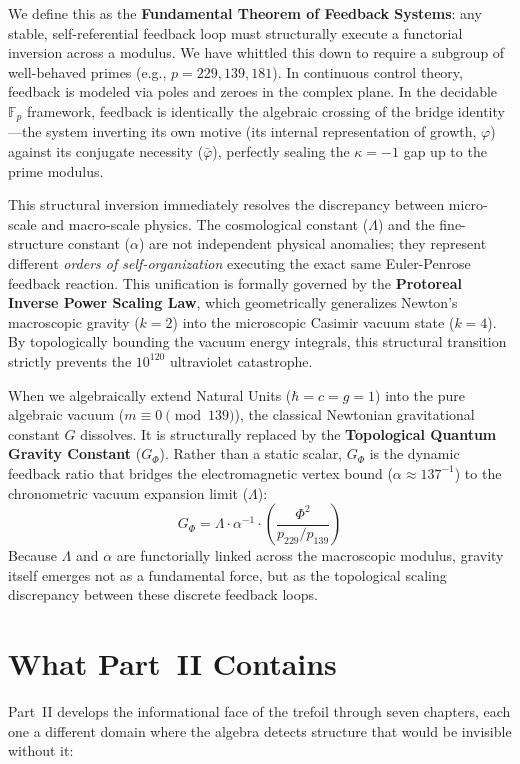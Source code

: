 We define this as the \textbf{Fundamental Theorem of Feedback Systems}: any stable, self-referential feedback loop must structurally execute a functorial inversion across a modulus. We have whittled this down to require a subgroup of well-behaved primes (e.g., $p = 229, 139, 181$). In continuous control theory, feedback is modeled via poles and zeroes in the complex plane. In the decidable $\mathbb{F}_p$ framework, feedback is identically the algebraic crossing of the bridge identity---the system inverting its own motive (its internal representation of growth, $\varphi$) against its conjugate necessity ($\bar{\varphi}$), perfectly sealing the $\kappa = -1$ gap up to the prime modulus.

This structural inversion immediately resolves the discrepancy between micro-scale and macro-scale physics. The cosmological constant ($\Lambda$) and the fine-structure constant ($\alpha$) are not independent physical anomalies; they represent different \emph{orders of self-organization} executing the exact same Euler-Penrose feedback reaction. This unification is formally governed by the \textbf{Protoreal Inverse Power Scaling Law}, which geometrically generalizes Newton's macroscopic gravity ($k=2$) into the microscopic Casimir vacuum state ($k=4$). By topologically bounding the vacuum energy integrals, this structural transition strictly prevents the $10^{120}$ ultraviolet catastrophe.

When we algebraically extend Natural Units ($\hbar = c = g = 1$) into the pure algebraic vacuum ($m \equiv 0 \pmod{139}$), the classical Newtonian gravitational constant $G$ dissolves. It is structurally replaced by the \textbf{Topological Quantum Gravity Constant} ($G_\Phi$). Rather than a static scalar, $G_\Phi$ is the dynamic feedback ratio that bridges the electromagnetic vertex bound ($\alpha \approx 137^{-1}$) to the chronometric vacuum expansion limit ($\Lambda$):
\[ G_\Phi = \Lambda \cdot \alpha^{-1} \cdot \left( \frac{\Phi^2}{p_{229} / p_{139}} \right) \]
Because $\Lambda$ and $\alpha$ are functorially linked across the macroscopic modulus, gravity itself emerges not as a fundamental force, but as the topological scaling discrepancy between these discrete feedback loops.

\section*{What Part~II Contains}

Part~II develops the informational face of the trefoil through seven chapters, each one a different domain where the algebra detects structure that would be invisible without it:

